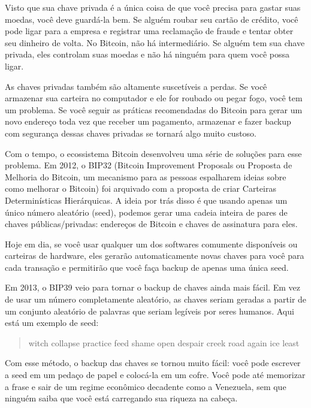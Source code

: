 Visto que sua chave privada é a única coisa de que você precisa para gastar suas moedas, você deve guardá-la bem. Se alguém roubar seu cartão de crédito, você pode ligar para a empresa e registrar uma reclamação de fraude e tentar obter seu dinheiro de volta. No Bitcoin, não há intermediário. Se alguém tem sua chave privada, eles controlam suas moedas e não há ninguém para quem você possa ligar.

As chaves privadas também são altamente suscetíveis a perdas. Se você armazenar sua carteira no computador e ele for roubado ou pegar fogo, você tem um problema. Se você seguir as práticas recomendadas do Bitcoin para gerar um novo endereço toda vez que receber um pagamento, armazenar e fazer backup com segurança dessas chaves privadas se tornará algo muito custoso.

Com o tempo, o ecossistema Bitcoin desenvolveu uma série de soluções para esse problema. Em 2012, o BIP32 (Bitcoin Improvement Proposals ou Proposta de Melhoria do Bitcoin, um mecanismo para as pessoas espalharem ideias sobre como melhorar o Bitcoin) foi arquivado com a proposta de criar Carteiras Determinísticas Hierárquicas. A ideia por trás disso é que usando apenas um único número aleatório (seed), podemos gerar uma cadeia inteira de pares de chaves públicas/privadas: endereços de Bitcoin e chaves de assinatura para eles.

Hoje em dia, se você usar qualquer um dos softwares comumente disponíveis ou carteiras de hardware, eles gerarão automaticamente novas chaves para você para cada transação e permitirão que você faça backup de apenas uma única seed.

Em 2013, o BIP39 veio para tornar o backup de chaves ainda mais fácil. Em vez de usar um número completamente aleatório, as chaves seriam geradas a partir de um conjunto aleatório de palavras que seriam legíveis por seres humanos. Aqui está um exemplo de seed:

\begin{samepage}
\begin{quote}{witch collapse practice feed shame open despair creek road again ice least}\end{quote}
\end{samepage}

Com esse método, o backup das chaves se tornou muito fácil: você pode escrever a seed em um pedaço de papel e colocá-la em um cofre. Você pode até memorizar a frase e sair de um regime econômico decadente como a Venezuela, sem que ninguém saiba que você está carregando sua riqueza na cabeça.

